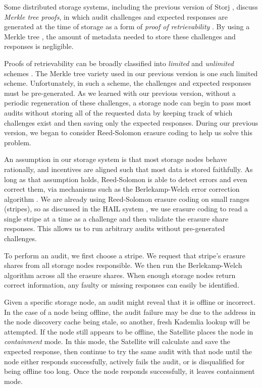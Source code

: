 \documentclass[8pt,fleqn,openany]{book}
\begin{document}
Some distributed storage systems, including the previous version of Storj
\cite{storj-v2}, discuss {\em Merkle tree proofs}, in which audit challenges
and expected responses are generated at the time of storage as a form of
{\em proof of retrievability} \cite{juels}. By using a Merkle tree
\cite{merkle-tree}, the amount of metadata needed to store these
challenges and responses is negligible.

Proofs of retrievability can be broadly classified into {\em limited} and
{\em unlimited} schemes \cite{juels2}. The Merkle tree variety used in
our previous version is one such limited scheme.
Unfortunately, in such a scheme, the challenges and expected responses must be
pre-generated. As we learned with our previous version, without a periodic
regeneration of these challenges, a storage node can begin to pass most
audits without storing all of the requested data by keeping track of which
challenges exist and then saving only the expected responses.
During our previous version,
we began to consider Reed-Solomon erasure coding to help us solve this problem.


An assumption in our storage system is that most storage nodes
behave rationally, and incentives are aligned such that
most data is stored faithfully. As long as that
assumption holds, Reed-Solomon is able to detect errors and even correct them,
via mechanisms such as the Berlekamp-Welch error correction algorithm
\cite{bw, rs-intro}.
We are already using Reed-Solomon erasure coding \cite{rs} on small ranges
(stripes), so as discussed in the HAIL system \cite{hail},
we use erasure coding to read a single stripe at a time as a challenge
and then validate the erasure share responses. This allows us to run arbitrary
audits without pre-generated challenges.

To perform an audit, we first choose a stripe. We request that
stripe's erasure shares from all storage nodes responsible. We then run
the Berlekamp-Welch algorithm \cite{bw, rs-intro} across all the
erasure shares. When enough storage nodes return correct information,
any faulty or missing responses can easily be identified.

Given a specific storage node, an audit might reveal that it is offline or
incorrect. In the case of a node being offline, the audit failure
may be due to the address in the node discovery cache being stale, so another,
fresh Kademlia lookup will be attempted. If the node still appears to be offline,
the Satellite places the node in {\em containment} mode. In this
mode, the Satellite will calculate and save the expected response, then
continue to try the same audit with that node
until the node either responds successfully, actively fails the audit, or
is disqualified for being offline too long. Once the node responds
successfully, it leaves containment mode.
\end{document}
